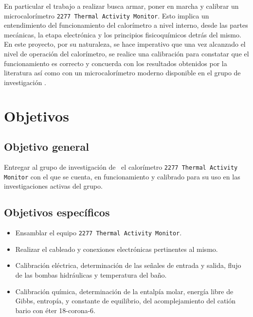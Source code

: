 	En particular el trabajo a realizar busca armar, poner en marcha y calibrar un microcalorímetro \texttt{2277 Thermal Activity Monitor}. Esto implica un entendimiento del funcionamiento del calorímetro a nivel interno, desde las partes mecánicas, la etapa electrónica y los principios fisicoquímicos detrás del mismo. En este proyecto, por su naturaleza, se hace imperativo que una vez alcanzado el nivel de operación del calorímetro, se realice una calibración para constatar que el funcionamiento es correcto y concuerda con los resultados obtenidos por la literatura así como con un microcalorímetro moderno disponible en el grupo de investigación \textit{\groupname}.
	
\section{Objetivos}
	\subsection{Objetivo general}
		Entregar al grupo de investigación de \groupname\ el calorímetro \texttt{2277 Thermal Activity Monitor} con el que se cuenta, en funcionamiento y calibrado para su uso en las investigaciones activas del grupo.
		
	\subsection{Objetivos específicos}
		\begin{itemize}
			\item Ensamblar el equipo \texttt{2277 Thermal Activity Monitor}.
			\item Realizar el cableado y conexiones electrónicas pertinentes al mismo.
			\item Calibración eléctrica, determinación de las señales de entrada y salida, flujo de las bombas hidráulicas y temperatura del baño.
			\item Calibración química, determinación de la entalpía molar, energía libre de Gibbs, entropía, y constante de equilibrio, del acomplejamiento del catión bario con éter 18-corona-6.
		\end{itemize}

